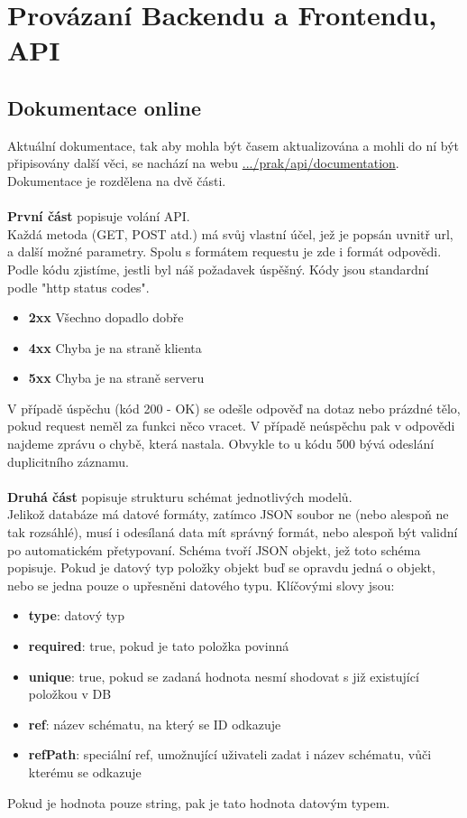 \chapter{Provázaní Backendu a Frontendu, API}

\section{Dokumentace online}
Aktuální dokumentace, tak aby mohla být časem aktualizována a mohli do ní
být připisovány další věci, se nachází na webu
\href{http://quest.ms.mff.cuni.cz/prak/api/documentation}{.../prak/api/documentation}.
\\
Dokumentace je rozdělena na dvě části.
\\
\\
\textbf{První část} popisuje volání API.\\
Každá metoda (GET, POST atd.) má svůj vlastní účel,
jež je popsán uvnitř url, a další možné parametry.
Spolu s formátem requestu je zde i formát odpovědi.
Podle kódu zjistíme, jestli byl náš požadavek úspěšný.
Kódy jsou standardní podle "http status codes".
\begin{itemize}
	\item \textbf{2xx} Všechno dopadlo dobře
	\item \textbf{4xx} Chyba je na straně klienta
	\item \textbf{5xx} Chyba je na straně serveru
\end{itemize}
V případě úspěchu (kód 200 - OK) se odešle odpověď na dotaz nebo
prázdné tělo, pokud request neměl za funkci něco vracet.
V případě neúspěchu pak v odpovědi najdeme zprávu o chybě, která nastala.
Obvykle to u kódu 500 bývá odeslání duplicitního záznamu.
\\
\\
\textbf{Druhá část} popisuje strukturu schémat jednotlivých modelů.\\
Jelikož databáze má datové formáty, zatímco JSON soubor ne (nebo alespoň ne tak rozsáhlé),
musí i odesílaná data mít správný formát, nebo alespoň být validní po automatickém
přetypovaní.
Schéma tvoří JSON objekt, jež toto schéma popisuje.
Pokud je datový typ položky objekt buď se opravdu jedná o objekt, nebo
se jedna pouze o upřesněni datového typu.
Klíčovými slovy jsou:
\begin{itemize}
	\item \textbf{type}: datový typ
	\item \textbf{required}: true, pokud je tato položka povinná
	\item \textbf{unique}: true, pokud se zadaná hodnota nesmí shodovat s již existující položkou v DB
	\item \textbf{ref}: název schématu, na který se ID odkazuje
	\item \textbf{refPath}: speciální ref, umožnující uživateli zadat i název schématu, vůči kterému se odkazuje
\end{itemize}
Pokud je hodnota pouze string, pak je tato hodnota datovým typem.

